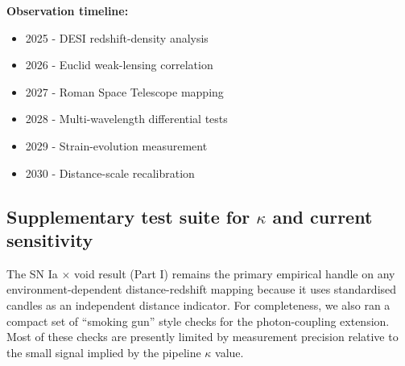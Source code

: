 \documentclass[11pt,a4paper]{article}
\begin{document}
\begin{mdframed}[linecolor=accent,linewidth=0.5pt,backgroundcolor=callout-bg,leftline=true,rightline=true,topline=true,bottomline=true,innerleftmargin=8pt,innerrightmargin=8pt,innertopmargin=6pt,innerbottommargin=6pt]
\textbf{Observation timeline:}\begin{itemize}
  \item 2025 - DESI redshift-density analysis
  \item 2026 - Euclid weak-lensing correlation
  \item 2027 - Roman Space Telescope mapping
  \item 2028 - Multi-wavelength differential tests
  \item 2029 - Strain-evolution measurement
  \item 2030 - Distance-scale recalibration
\end{itemize}
\end{mdframed}

\subsection{Supplementary test suite for $\kappa$ and current sensitivity}
The SN Ia $\times$ void result (Part I) remains the primary empirical handle on any environment-dependent distance-redshift mapping because it uses
standardised candles as an independent distance indicator. For completeness, we also ran a compact set of ``smoking gun'' style checks for the photon-coupling extension.
Most of these checks are presently limited by measurement precision relative to the small signal implied by the pipeline $\kappa$ value.
\end{document}

